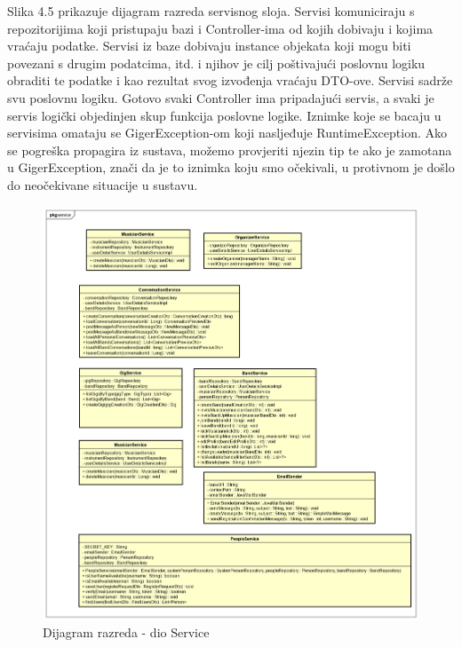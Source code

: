 		Slika 4.5 prikazuje dijagram razreda servisnog sloja. Servisi komuniciraju s repozitorijima koji pristupaju bazi i Controller-ima od kojih dobivaju i kojima vraćaju podatke. Servisi iz baze dobivaju instance objekata koji mogu biti povezani s drugim podatcima, itd. i njihov je cilj poštivajući poslovnu logiku obraditi te podatke i kao rezultat svog izvođenja vraćaju DTO-ove. Servisi sadrže svu poslovnu logiku. Gotovo svaki Controller ima pripadajući servis, a svaki je servis logički objedinjen skup funkcija poslovne logike. Iznimke koje se bacaju u servisima omataju se GigerException-om koji nasljeđuje RuntimeException. Ako se pogreška propagira iz sustava, možemo provjeriti njezin tip te ako je zamotana u GigerException, znači da je to iznimka koju smo očekivali, u protivnom je došlo do neočekivane situacije u sustavu.
		
		\begin{figure}[H]
			\begin{center}
				\includegraphics[width=16cm]{slike/service.PNG}
			\end{center}
			\caption{Dijagram razreda - dio Service}
			\label{fig:service}
		\end{figure}
	
